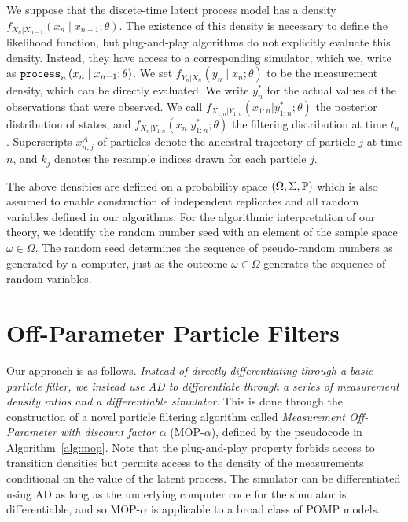 \documentclass[9pt,twocolumn,pnasresearcharticle]{pnas-new}
\newcommand\arxiv[2]{#2} %
\begin{document}
We suppose that the discete-time latent process model has a density $f_{X_n|X_{n-1}}\left(x_{n} \mid x_{n-1}; \theta\right)$.
The existence of this density is necessary to define the likelihood function, but plug-and-play algorithms do not explicitly evaluate this density.
Instead, they have access to a corresponding simulator, which we, write as $\texttt{process}_n\left(x_n\mid x_{n-1}; \theta\right)$.
We set $f_{Y_n|X_n}\left(y_n \mid x_n; \theta\right)$ to be the measurement density, which  can be directly evaluated. We write $y_n^*$ for the actual values of the observations that were observed.
We call $f_{X_{1:n}|Y_{1:n}}(x_{1:n}|y_{1:n}^*; \theta)$ the posterior distribution of states, and $f_{X_{n}|Y_{1:n}}(x_n|y_{1:n}^*; \theta)$ the filtering distribution at time $t_n$.
Superscripts $x_{n,j}^A$ of particles denote the ancestral trajectory of particle $j$ at time $n$,  and $k_j$
denotes the resample indices drawn for each particle $j$. 

The above densities are defined on a probability space $(\Omega, \Sigma, \mathbb{P})$ which is also assumed to enable construction of independent replicates and all random variables defined in our algorithms.
For the algorithmic interpretation of our theory, we identify the random number seed with an element of the sample space $\omega \in \Omega$. The random seed determines the sequence of pseudo-random numbers as generated by a computer, just as the outcome $\omega\in\Omega$ generates the sequence of random variables.


\arxiv{}{\vspace*{-2mm}}
\section{Off-Parameter Particle Filters}

Our approach is as follows. \textit{Instead of directly differentiating through a basic particle filter, we instead use AD to differentiate through a series of measurement density ratios and a differentiable simulator}. 
This is done through the construction of a novel particle filtering algorithm called {\it Measurement Off-Parameter with discount factor} $\alpha$ (MOP-$\alpha$), defined by the pseudocode in Algorithm~\ref{alg:mop}.
Note that the plug-and-play property forbids access to transition densities but permits access to the density of the measurements conditional on the value of the latent process.
The simulator can be differentiated using AD as long as the underlying computer code for the simulator is differentiable, and so MOP-$\alpha$ is applicable to a broad class of POMP models.
\end{document}
